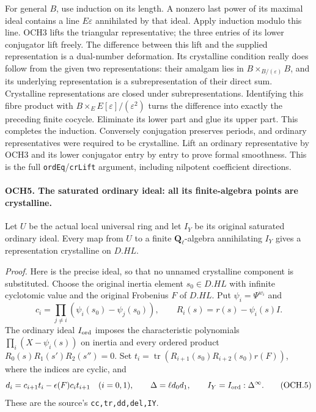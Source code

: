 \documentclass[11pt,a4paper]{article}
\numberwithin{equation}{section}
\theoremstyle{remark}\newtheorem{remark}[theorem]{Remark}
\begin{document}
For general \(B\), use induction on its length.  A nonzero last
power of its maximal ideal contains a line \(E\varepsilon\)
annihilated by that ideal.  Apply induction modulo this line.
OCH3 lifts the triangular representative; the three entries of its
lower conjugator lift freely.  The difference between this lift and
the supplied representation is a dual-number deformation.  Its
crystalline condition really does follow from the given two
representations: their amalgam lies in
\(B\times_{B/(\varepsilon)}B\), and its underlying representation
is a subrepresentation of their direct sum.  Crystalline
representations are closed under subrepresentations.  Identifying
this fibre product with \(B\times_E E[\varepsilon]/(\varepsilon^2)\)
turns the difference into exactly the preceding finite cocycle.
Eliminate its lower part and glue its upper part.  This completes
the induction.  Conversely conjugation preserves periods, and
ordinary representatives were required to be crystalline.
Lift an ordinary representative by OCH3 and its lower conjugator
entry by entry to prove formal smoothness.  This is the full
\texttt{ord\allowbreak Eq}/\texttt{cr\allowbreak Lift} argument, including nilpotent
coefficient directions.

\paragraph{OCH5. The saturated ordinary ideal: all its finite-algebra points are crystalline.}
\label{claim:OCH5}
Let \(U\) be the actual local universal ring and let \(I_Y\)
be its original saturated ordinary ideal.  Every map from
\(U\) to a finite \(\mathbf Q_\ell\)-algebra annihilating
\(I_Y\) gives a representation crystalline on \(D.HL\).

\emph{Proof.}
Here is the precise ideal, so that no unnamed crystalline component
is substituted.  Choose the original inertia element \(s_0\in D.HL\)
with infinite cyclotomic value and the original Frobenius \(F\)
of \(D.HL\).  Put \(\psi_i=\Psi^{w_i}\) and
\[
 c_i=\prod_{j\ne i}(\psi_i(s_0)-\psi_j(s_0)),\qquad
 R_i(s)=r(s)-\psi_i(s)I.
\]
The ordinary ideal \(I_{\rm ord}\) imposes the characteristic
polynomials \(\prod_i(X-\psi_i(s))\) on inertia and every ordered
product \(R_0(s)R_1(s')R_2(s'')=0\).
Set \(t_i=\operatorname{tr}(R_{i+1}(s_0)R_{i+2}(s_0)r(F))\),
where the indices are cyclic, and
\[
 d_i=c_{i+1}t_i-\epsilon(F)c_i t_{i+1}\quad(i=0,1),
 \qquad \Delta=\ell d_0d_1,
 \qquad I_Y=I_{\rm ord}:\Delta^\infty.
 \tag{OCH.5}
\]
These are the source's \texttt{cc,tr,dd,del,IY}.
\end{document}
